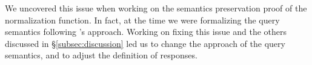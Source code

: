 %
We uncovered this issue when working on the semantics preservation proof of the normalization function. In fact, at the time we were formalizing the query semantics following \HP's approach. Working on fixing this issue and the others discussed in \S\ref{subsec:discussion} led us to change the approach of the query semantics, and to adjust the definition of responses.




